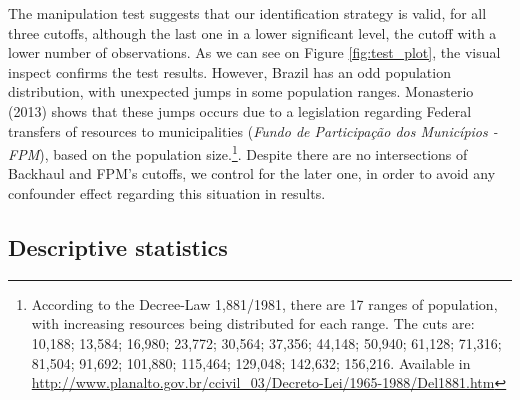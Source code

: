 \documentclass[
  12pt,
]{article}
\begin{document}
The manipulation test suggests that our identification strategy is
valid, for all three cutoffs, although the last one in a lower
significant level, the cutoff with a lower number of observations. As we
can see on Figure \ref{fig:test_plot}, the visual inspect confirms the
test results. However, Brazil has an odd population distribution, with
unexpected jumps in some population ranges. Monasterio (2013) shows that
these jumps occurs due to a legislation regarding Federal transfers of
resources to municipalities (\emph{Fundo de Participação dos Municípios
- FPM}), based on the population size.\footnote{According to the
  Decree-Law 1,881/1981, there are 17 ranges of population, with
  increasing resources being distributed for each range. The cuts are:
  10,188; 13,584; 16,980; 23,772; 30,564; 37,356; 44,148; 50,940;
  61,128; 71,316; 81,504; 91,692; 101,880; 115,464; 129,048; 142,632;
  156,216. Available in
  \url{http://www.planalto.gov.br/ccivil_03/Decreto-Lei/1965-1988/Del1881.htm}}.
Despite there are no intersections of Backhaul and FPM's cutoffs, we
control for the later one, in order to avoid any confounder effect
regarding this situation in results.

\hypertarget{descriptive-statistics}{%
\subsection{Descriptive statistics}\label{descriptive-statistics}}
\end{document}
